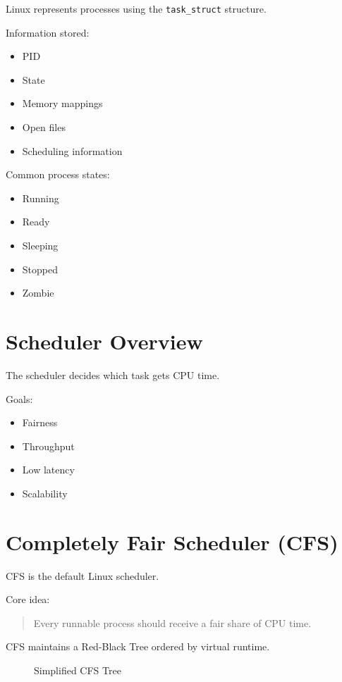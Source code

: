 Linux represents processes using the \texttt{task\_struct} structure.

Information stored:

\begin{itemize}
\item PID
\item State
\item Memory mappings
\item Open files
\item Scheduling information
\end{itemize}

Common process states:

\begin{itemize}
\item Running
\item Ready
\item Sleeping
\item Stopped
\item Zombie
\end{itemize}

\section{Scheduler Overview}

The scheduler decides which task gets CPU time.

Goals:

\begin{itemize}
\item Fairness
\item Throughput
\item Low latency
\item Scalability
\end{itemize}

\section{Completely Fair Scheduler (CFS)}

CFS is the default Linux scheduler.

Core idea:

\begin{quote}
Every runnable process should receive a fair share of CPU time.
\end{quote}

CFS maintains a Red-Black Tree ordered by virtual runtime.

\begin{figure}[H]
\centering
{}
\caption{Simplified CFS Tree}
\end{figure}


